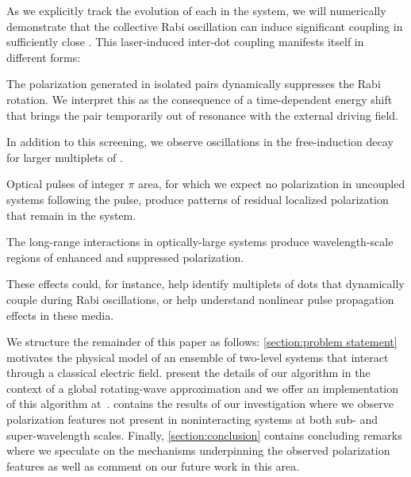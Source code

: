 As we explicitly track the evolution of each \qd{} in the system, we will numerically demonstrate that the collective Rabi oscillation can induce significant coupling in sufficiently close \qds{}.
This laser-induced inter-dot coupling manifests itself in different forms:
\begin{inparaenum}[(i)]
  \item The polarization generated in isolated \qd{} pairs dynamically suppresses the Rabi rotation.
  We interpret this as the consequence of a time-dependent energy shift that brings the pair temporarily out of resonance with the external driving field.
  \item In addition to this screening, we observe oscillations in the free-induction decay for larger multiplets of \qds{}.
  \item Optical pulses of integer $\pi$ area, for which we expect no polarization in uncoupled systems following the pulse, produce patterns of residual localized polarization that remain in the system.
  \item The long-range interactions in optically-large systems produce wavelength-scale regions of enhanced and suppressed polarization.
\end{inparaenum}
These effects could, for instance, help identify multiplets of dots that dynamically couple during Rabi oscillations, or help understand nonlinear pulse propagation effects in these media.

We structure the remainder of this paper as follows: \cref{section:problem statement} motivates the physical model of an ensemble of two-level systems that interact through a classical electric field.
 present the details of our algorithm in the context of a global rotating-wave approximation and we offer an implementation of this algorithm at~\cite{githubpage}.
 contains the results of our investigation where we observe polarization features not present in noninteracting systems at both sub- and super-wavelength scales.
Finally, \cref{section:conclusion} contains concluding remarks where we speculate on the mechanisms underpinning the observed polarization features as well as comment on our future work in this area.
